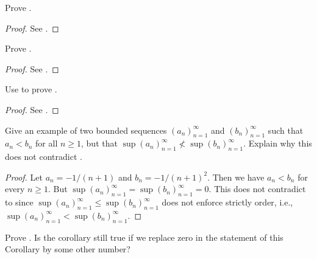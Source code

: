 \begin{ex}\label{i:ex:6.4.3}
  Prove .
\end{ex}

\begin{proof}
  See .
\end{proof}

\begin{ex}\label{i:ex:6.4.4}
  Prove .
\end{ex}

\begin{proof}
  See .
\end{proof}

\begin{ex}\label{i:ex:6.4.5}
  Use  to prove .
\end{ex}

\begin{proof}
  See .
\end{proof}

\begin{ex}\label{i:ex:6.4.6}
  Give an example of two bounded sequences \((a_n)_{n = 1}^\infty\) and \((b_n)_{n = 1}^\infty\) such that \(a_n < b_n\) for all \(n \geq 1\), but that \(\sup(a_n)_{n = 1}^\infty \not< \sup(b_n)_{n = 1}^\infty\).
  Explain why this does not contradict .
\end{ex}

\begin{proof}
  Let \(a_n = -1 / (n + 1)\) and \(b_n = -1 / (n + 1)^2\).
  Then we have \(a_n < b_n\) for every \(n \geq 1\).
  But \(\sup(a_n)_{n = 1}^\infty = \sup(b_n)_{n = 1}^\infty = 0\).
  This does not contradict to  since \(\sup(a_n)_{n = 1}^\infty \leq \sup(b_n)_{n = 1}^\infty\) does not enforce strictly order, i.e., \(\sup(a_n)_{n = 1}^\infty < \sup(b_n)_{n = 1}^\infty\).
\end{proof}

\begin{ex}\label{i:ex:6.4.7}
  Prove .
  Is the corollary still true if we replace zero in the statement of this Corollary by some other number?
\end{ex}

